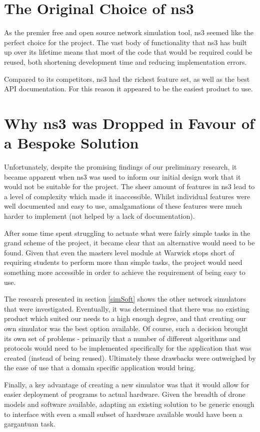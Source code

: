 \section{The Original Choice of ns3}
As the premier free and open source network simulation tool, ns3 seemed like the perfect choice for the project. The vast body of functionality that ns3 has built up over its lifetime means that most of the code that would be required could be reused, both shortening development time and reducing implementation errors.

Compared to its competitors, ns3 had the richest feature set, as well as the best API documentation. For this reason it appeared to be the easiest product to use.

\section{Why ns3 was Dropped in Favour of a Bespoke Solution}
Unfortunately, despite the promising findings of our preliminary research, it became apparent when ns3  was used to inform our initial design work that it would not be suitable for the project. The sheer amount of features in ns3 lead to a level of complexity which made it inaccessible. Whilst individual features were well documented and easy to use, amalgamations of these features were much harder to implement (not helped by a lack of documentation).

After some time spent struggling to actuate what were fairly simple tasks in the grand scheme of the project, it became clear that an alternative would need to be found. Given that even the masters level module at Warwick stops short of requiring students to perform more than simple tasks, the project would need something more accessible in order to achieve the requirement of being easy to use.

The research presented in section \ref{simSoft} shows the other network simulators that were investigated. Eventually, it was determined that there was no existing product which suited our needs to a high enough degree, and that creating our own simulator was the best option available. Of course, such a decision brought its own set of problems - primarily that a number of different algorithms and protocols would need to be implemented specifically for the application that was created (instead of being reused). Ultimately these drawbacks were outweighed by the ease of use that a domain specific application would bring.

Finally, a key advantage of creating a new simulator was that it would allow for easier deployment of programs to actual hardware. Given the breadth of drone models and software available, adapting an existing solution to be generic enough to interface with even a small subset of hardware available would have been a gargantuan task.

